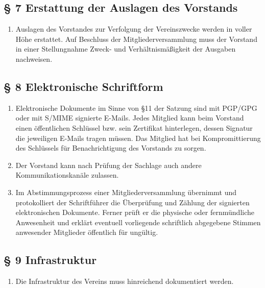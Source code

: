 \documentclass[10pt,a4paper]{article}
\begin{document}
\subsection*{§ 7 Erstattung der Auslagen des Vorstands}
\begin{enumerate}
\item Auslagen des Vorstandes zur Verfolgung der Vereinszwecke werden
	in voller Höhe erstattet. Auf Beschluss der Mitgliederversammlung
	muss der Vorstand in einer Stellungnahme Zweck- und Verhältnis\-mäßigkeit
	der Ausgaben nachweisen.
\end{enumerate}
%
%
\subsection*{§ 8 Elektronische Schriftform}
\begin{enumerate}
\item Elektronische Dokumente im Sinne von §11 der Satzung sind mit PGP/GPG
	oder mit S/MIME signierte E-Mails. Jedes Mitglied kann beim Vorstand
	einen öffentlichen Schlüssel bzw. sein Zertifikat hinterlegen, dessen
	Signatur die jeweiligen E-Mails tragen müssen. Das Mitglied hat bei
	Kompromittierung des Schlüssels für Benachrichtigung des Vorstands
	zu sorgen.
\item Der Vorstand kann nach Prüfung der Sachlage auch andere Kommunikationskanäle zulassen.
\item Im Abstimmungsprozess einer Mitgliederversammlung
	übernimmt und protokolliert der Schriftführer die Überprüfung und
    Zählung der signierten elektronischen Dokumente. Ferner prüft er die physische oder fernmündliche Anwesenheit und
	erklärt eventuell vorliegende schriftlich abgegebene Stimmen anwesender
	Mitglieder öffentlich für ungültig.
\end{enumerate}
%
%
\subsection*{§ 9 Infrastruktur}
\begin{enumerate}
\item Die Infrastruktur des Vereins muss hinreichend dokumentiert werden.
\end{enumerate}
\end{document}
